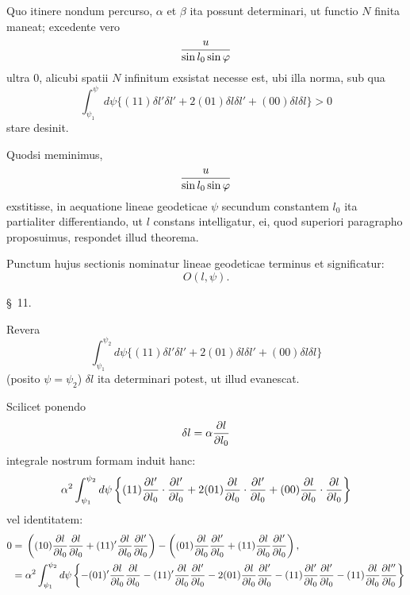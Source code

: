 Quo itinere nondum percurso, $\alpha$ et $\beta$ ita possunt determinari, ut functio $N$ finita maneat; excedente vero
\[
 {u\over \sin l_0\sin\varphi}
\]
ultra $0$, alicubi spatii $N$ infinitum exsistat necesse est, ubi illa norma, sub qua
\[
 \int_{\psi_1}^{\psi}d\psi\{(11)\delta l'\delta l'+2(01)\delta l\delta l'+(00)\delta l\delta l\}>0
\]
stare desinit.

Quodsi meminimus,
\[
 {u\over \sin l_0\sin\varphi}
\]
exstitisse, in aequatione lineae geodeticae $\psi$ secundum constantem $l_0$ ita partialiter differentiando, ut $l$ constans intelligatur, ei, quod superiori paragrapho proposuimus, respondet illud theorema.

\begin{quote}
\end{quote}

Punctum hujus sectionis nominatur lineae geodeticae terminus et significatur:
\[
 O(l,\psi).
\]

\begin{center}\S\ 11.\end{center}

Revera
\[
 \int_{\psi_1}^{\psi_2}d\psi\{(11)\delta l'\delta l'+2(01)\delta l\delta l'+(00)\delta l\delta l\}
\]
(posito $\psi=\psi_2$) $\delta l$ ita determinari potest, ut illud evanescat.

Scilicet ponendo
\[
 \delta l=\alpha{\partial l\over \partial l_0}
\]
integrale nostrum formam induit hanc:
\[
 \alpha^2\int_{\psi_1}^{\psi_2}d\psi\left\{(11){\partial l'\over \partial l_0}\cdot{\partial l'\over \partial l_0}
 +2(01){\partial l\over \partial l_0}\cdot{\partial l'\over \partial l_0}
 +(00){\partial l\over \partial l_0}\cdot{\partial l\over \partial l_0}\right\}
\]
vel identitatem:
\[
\begin{aligned}
0={}&\left((10){\partial l\over \partial l_0}{\partial l\over \partial l_0}+(11)'{\partial l\over \partial l_0}{\partial l'\over \partial l_0}\right)
-\left((01){\partial l\over \partial l_0}{\partial l'\over \partial l_0}+(11){\partial l\over \partial l_0}{\partial l'\over \partial l_0}\right),\\
={}&\alpha^2\int_{\psi_1}^{\psi_2}d\psi\left\{-(01)'{\partial l\over \partial l_0}{\partial l\over \partial l_0}
-(11)'{\partial l\over \partial l_0}{\partial l'\over \partial l_0}
-2(01){\partial l\over \partial l_0}{\partial l'\over \partial l_0}
-(11){\partial l'\over \partial l_0}{\partial l'\over \partial l_0}
-(11){\partial l\over \partial l_0}{\partial l''\over \partial l_0}\right\}
\end{aligned}
\]
